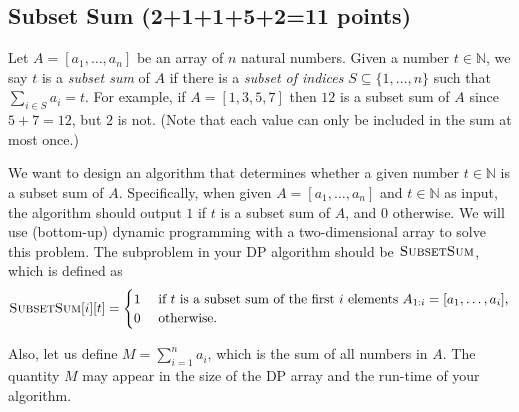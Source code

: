 \subsection{Subset Sum (2+1+1+5+2=11 points)}
Let $A = [a_1, \ldots, a_n]$ be an array of $n$ natural numbers. Given a number $t \in \mathbb{N}$, we say $t$ is a \emph{subset sum} of $A$ if there is a \emph{subset of indices} $S \subseteq \{1,\ldots,n\}$ such that $\sum_{i \in S} a_i = t$. For example, if $A=[1,3,5,7]$ then $12$ is a subset sum of $A$ since $5+7=12$, but $2$ is not. (Note that each value can only be included in the sum at most once.)

We want to design an algorithm that determines whether a given number $t \in \mathbb{N}$ is a subset sum of $A$. Specifically, when given $A = [a_1,\ldots,a_n]$ and $t \in \mathbb{N}$ as input, the algorithm should output $1$ if $t$ is a subset sum of $A$, and $0$ otherwise.
We will use (bottom-up) dynamic programming with a two-dimensional array to solve this problem. The subproblem in your DP algorithm should be $\textsc{SubsetSum}$, which is defined as
\begin{align*}
\textsc{SubsetSum}[i][t] = 
\begin{cases} 
    1 &\text{ if $t$ is a subset sum of the first $i$ elements $A_{1:i}=[a_1,\ldots,a_i]$,} \\
    0 &\text{ otherwise.}
\end{cases}
\end{align*}

Also, let us define $M = \sum_{i=1}^n a_i$, which is the sum of all numbers in $A$. The quantity $M$ may appear in the size of the DP array and the run-time of your algorithm.

